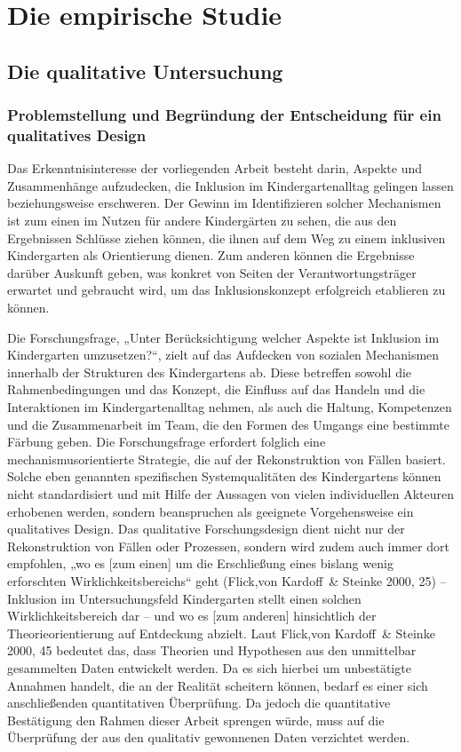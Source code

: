 \part{Die empirische Studie}
\chapter{Die qualitative Untersuchung}
\section{Problemstellung und Begründung der Entscheidung für ein qualitatives Design}
Das Erkenntnisinteresse der vorliegenden Arbeit besteht darin, Aspekte und Zusammenhänge aufzudecken, die Inklusion im Kindergartenalltag gelingen lassen beziehungsweise erschweren. Der Gewinn im Identifizieren solcher Mechanismen ist zum einen im Nutzen für andere Kindergärten zu sehen, die aus den Ergebnissen Schlüsse ziehen können, die ihnen auf dem Weg zu einem inklusiven Kindergarten als Orientierung dienen. Zum anderen können die Ergebnisse darüber Auskunft geben, was konkret von Seiten der Verantwortungsträger erwartet und gebraucht wird, um das Inklusionskonzept erfolgreich etablieren zu können.

Die Forschungsfrage, „Unter Berücksichtigung welcher Aspekte ist Inklusion im Kindergarten umzusetzen?“, zielt auf das Aufdecken von sozialen Mechanismen innerhalb der Strukturen des Kindergartens ab. Diese betreffen sowohl die Rahmenbedingungen und das Konzept, die  Einfluss auf das Handeln und die Interaktionen im Kindergartenalltag nehmen, als auch die Haltung, Kompetenzen und die Zusammenarbeit im Team, die den Formen des Umgangs eine bestimmte Färbung geben. Die Forschungsfrage erfordert folglich eine mechanismusorientierte Strategie, die auf der Rekonstruktion von Fällen basiert. Solche eben genannten spezifischen Systemqualitäten des Kindergartens können nicht standardisiert und mit Hilfe der Aussagen von vielen individuellen Akteuren erhobenen werden, sondern beanspruchen als geeignete Vorgehensweise ein  
qualitatives Design. Das qualitative Forschungsdesign dient nicht nur der Rekonstruktion von Fällen oder Prozessen, sondern wird zudem auch immer dort empfohlen, „wo es [zum einen] um die Erschließung eines bislang wenig erforschten Wirklichkeitsbereichs“ geht (Flick,von Kardoff~\& Steinke 2000, 25) -- Inklusion im Untersuchungsfeld Kindergarten stellt einen solchen Wirklichkeitsbereich dar -- und wo es [zum anderen] hinsichtlich der Theorieorientierung auf Entdeckung abzielt.
Laut Flick,von Kardoff~\& Steinke 2000, 45 bedeutet das, dass Theorien und Hypothesen aus den unmittelbar gesammelten Daten entwickelt werden. Da es sich hierbei um unbestätigte Annahmen handelt, die an der Realität scheitern können, bedarf es einer sich anschließenden  quantitativen Überprüfung. 
Da jedoch die quantitative Bestätigung den Rahmen dieser Arbeit sprengen würde, muss auf die Überprüfung der aus den qualitativ gewonnenen Daten verzichtet werden.

